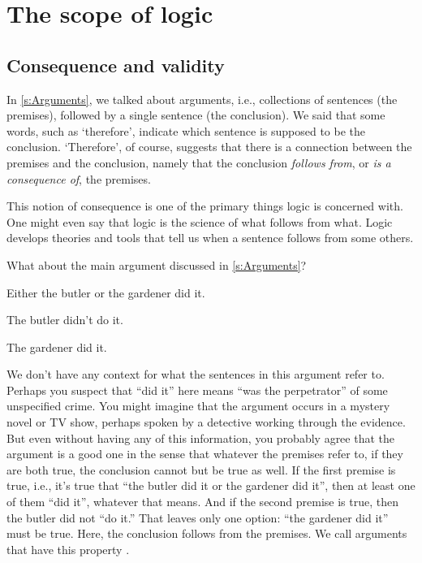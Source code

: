 \chapter{The scope of logic}
\label{s:Valid}

\section{Consequence and validity}

In \cref{s:Arguments}, we talked about arguments, i.e., collections of sentences (the premises), followed by a single sentence (the conclusion). We said that some words, such as `therefore', indicate which sentence is supposed to be the conclusion. `Therefore', of course, suggests that there is a connection between the premises and the conclusion, namely that the conclusion \emph{follows from}, or \emph{is a consequence of}, the premises.

This notion of consequence is one of the primary things logic is concerned with. One might even say that logic is the science of what follows from what.  Logic develops theories and tools that tell us when a sentence follows from some others.

What about the main argument discussed in \cref{s:Arguments}? 
\begin{earg}
	\item[] Either the butler or the gardener did it.
	\item[] The butler didn't do it.
	\item[\texttherefore] The gardener did it.
\end{earg}
We don't have any context for what the sentences in this argument refer to. Perhaps you suspect that ``did it'' here means ``was the perpetrator'' of some unspecified crime. You might imagine that the argument occurs in a mystery novel or TV show, perhaps spoken by a detective working through the evidence. But even without having any of this information, you probably agree that the argument is a good one in the sense that whatever the premises refer to, if they are both true, the conclusion cannot but be true as well. If the first premise is true, i.e., it's true that ``the butler did it or the gardener did it'', then at least one of them ``did it'', whatever that means. And if the second premise is true, then the butler did not ``do it.'' That leaves only one option: ``the gardener did it'' must be true. Here, the conclusion follows from the premises. We call arguments that have this property .


